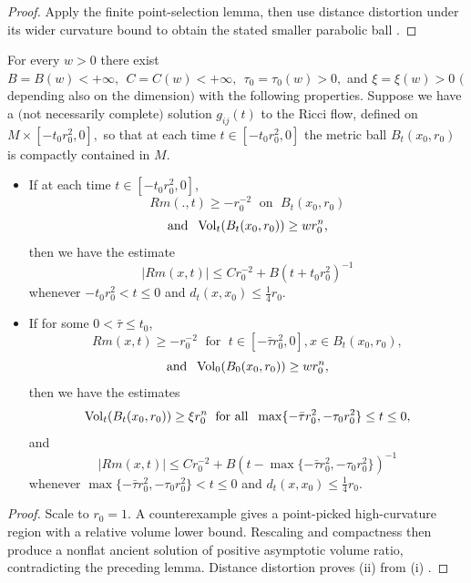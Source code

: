 \begin{proof}
\sketch Apply the finite point-selection lemma, then use distance
distortion under its wider curvature bound to obtain the stated smaller
parabolic ball \cite{P1}.
\end{proof}
\begin{theorem}
  \label{thm:cz-local-volume-growth-curvature-estimate}

For every $w>0$ there exist $B=B(w)<+\infty,\ \ C=C(w)<+\infty, \
\ \tau_0=\tau_0(w)>0,$ and $\xi=\xi(w)>0$ $($depending also on the
dimension$)$ with the following properties. Suppose we have a
$($not necessarily complete$)$ solution $g_{ij}(t)$ to the Ricci
flow, defined on $M\times[-t_0r_0^2,0],$ so that at each time
$t\in [-t_0r_0^2,0]$ the metric ball $B_t(x_0,r_0)$ is compactly
contained in $M.$
\begin{itemize}
\item[(i)] If at each time $t \in [-t_0r_0^2,0]$,
$$
Rm(.,t)\geq -r_0^{-2} \; \mbox{ on }\; B_t(x_0,r_0)
$$
$$
\mbox{and } \; \operatorname{Vol}_t(B_t(x_0,r_0))\geq wr_0^n,
$$
then we have the estimate
$$
|Rm(x,t)|\leq Cr_0^{-2}+B(t+t_0r_0^2)^{-1}
$$
whenever $-t_0r_0^2 < t\leq 0$ and $d_t(x,x_0)\leq
\frac{1}{4}r_0.$ \item[(ii)] If for some $0 < \bar{\tau} \leq
t_0$,
$$
Rm(x,t)\geq -r_0^{-2} \; \mbox{ for }\; t\in [-\bar{\tau}
r_0^2,0], x\in B_t(x_0,r_0),
$$
$$
\mbox{and } \; \operatorname{Vol}_0(B_0(x_0,r_0))\geq wr_0^n,
$$
then we have the estimates
$$
\operatorname{Vol}_t(B_t(x_0,r_0))\geq \xi r_0^n\; \mbox{ for all }\;
\max\{-\bar{\tau}r_0^2,-\tau_0r_0^2\}   \leq t \leq 0,
$$
and
$$
|Rm(x,t)|\leq Cr_0^{-2}+B(t -\max\{-\bar{\tau}r_0^2,-\tau_0r_0^2\}
)^{-1}
$$
whenever $\max\{-\bar{\tau}r_0^2,-\tau_0r_0^2\} < t\leq 0$ and
$d_t(x,x_0)\leq \frac{1}{4}r_0.$
\end{itemize}
\end{theorem}
\begin{proof}
\sketch Scale to $r_0=1$.  A counterexample gives a point-picked
high-curvature region with a relative volume lower bound.  Rescaling and
compactness then produce a nonflat ancient solution of positive
asymptotic volume ratio, contradicting the preceding lemma.  Distance
distortion proves (ii) from (i) \cite{P1}.
\end{proof}
